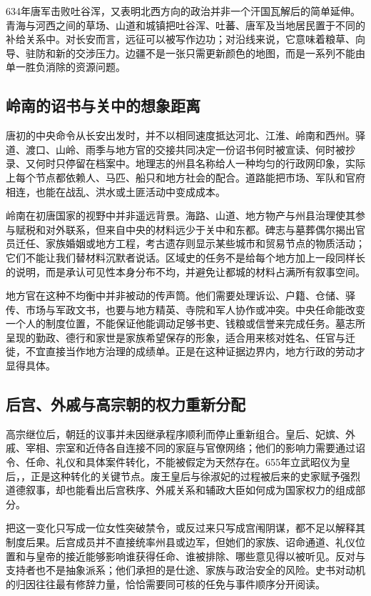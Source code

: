 634年唐军击败吐谷浑，又表明北西方向的政治并非一个汗国瓦解后的简单延伸。青海与河西之间的草场、山道和城镇把吐谷浑、吐蕃、唐军及当地居民置于不同的补给关系中。对长安而言，远征可以被写作边功；对沿线来说，它意味着粮草、向导、驻防和新的交涉压力。边疆不是一张只需更新颜色的地图，而是一系列不能由单一胜负消除的资源问题。

\subsection{岭南的诏书与关中的想象距离}
唐初的中央命令从长安出发时，并不以相同速度抵达河北、江淮、岭南和西州。驿道、渡口、山岭、雨季与地方官的交接共同决定一份诏书何时被宣读、何时被抄录、又何时只停留在档案中。地理志的州县名称给人一种均匀的行政网印象，实际上每个节点都依赖人、马匹、船只和地方社会的配合。道路能把市场、军队和官府相连，也能在战乱、洪水或土匪活动中变成成本。

岭南在初唐国家的视野中并非遥远背景。海路、山道、地方物产与州县治理使其参与赋税和对外联系，但来自中央的材料远少于关中和东都。碑志与墓葬偶尔揭出官员迁任、家族婚姻或地方工程，考古遗存则显示某些城市和贸易节点的物质活动；它们不能让我们替材料沉默者说话。区域史的任务不是给每个地方加上一段同样长的说明，而是承认可见性本身分布不均，并避免让都城的材料占满所有叙事空间。

地方官在这种不均衡中并非被动的传声筒。他们需要处理诉讼、户籍、仓储、驿传、市场与军政文书，也要与地方精英、寺院和军人协作或冲突。中央任命能改变一个人的制度位置，不能保证他能调动足够书吏、钱粮或信誉来完成任务。墓志所呈现的勤政、德行和家世是家族希望保存的形象，适合用来核对姓名、任官与迁徙，不宜直接当作地方治理的成绩单。正是在这种证据边界内，地方行政的劳动才显得具体。

\subsection{后宫、外戚与高宗朝的权力重新分配}
高宗继位后，朝廷的议事并未因继承程序顺利而停止重新组合。皇后、妃嫔、外戚、宰相、宗室和近侍各自连接不同的家庭与官僚网络；他们的影响力需要通过诏令、任命、礼仪和具体案件转化，不能被假定为天然存在。655年立武昭仪为皇后，，正是这种转化的关键节点。废王皇后与徐淑妃的过程被后来的史家赋予强烈道德叙事，却也能看出后宫秩序、外戚关系和辅政大臣如何成为国家权力的组成部分。

把这一变化只写成一位女性突破禁令，或反过来只写成宫闱阴谋，都不足以解释其制度后果。后宫成员并不直接统率州县或边军，但她们的家族、诏命通道、礼仪位置和与皇帝的接近能够影响谁获得任命、谁被排除、哪些意见得以被听见。反对与支持者也不是抽象派系；他们承担的是仕途、家族与政治安全的风险。史书对动机的归因往往最有修辞力量，恰恰需要同可核的任免与事件顺序分开阅读。

